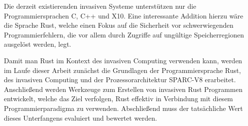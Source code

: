 Die derzeit existierenden invasiven Systeme unterstützen nur die Programmiersprachen C, C++ und X10.
Eine interessante Addition hierzu wäre die Sprache Rust,
welche einen Fokus auf die Sicherheit vor schwerwiegenden Programmierfehlern, die vor 
allem durch Zugriffe auf ungültige Speicherregionen ausgelöst werden, legt.

Damit man Rust im Kontext des invasiven Computing verwenden kann,
werden im Laufe dieser Arbeit zunächst die Grundlagen der Programmiersprache Rust,
des invasiven Computing und der Prozessorarchitektur SPARC-V8 erarbeitet. 
Anschließend werden Werkzeuge zum Erstellen von invasiven
Rust Programmen entwickelt, welche das Ziel verfolgen,
Rust effektiv in Verbindung mit diesem Programmierparadigma zu verwenden.
Abschließend muss der tatsächliche Wert dieses Unterfangens evaluiert und bewertet werden.
